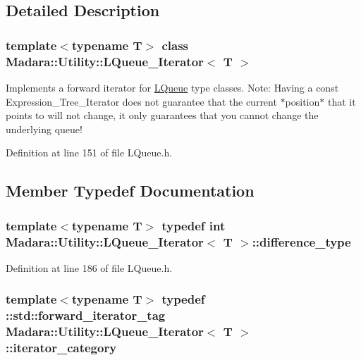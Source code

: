 \subsection{Detailed Description}
\subsubsection*{template$<$typename T$>$ class Madara::Utility::LQueue\_\-Iterator$<$ T $>$}

Implements a forward iterator for \hyperlink{classMadara_1_1Utility_1_1LQueue}{LQueue} type classes. Note: Having a const Expression\_\-Tree\_\-Iterator does not guarantee that the current $\ast$position$\ast$ that it points to will not change, it only guarantees that you cannot change the underlying queue! 

Definition at line 151 of file LQueue.h.



\subsection{Member Typedef Documentation}
\hypertarget{classMadara_1_1Utility_1_1LQueue__Iterator_a2cd150570b835cbf73880e080e4d69c3}{
\subsubsection[{difference\_\-type}]{\setlength{\rightskip}{0pt plus 5cm}template$<$typename T$>$ typedef int {\bf Madara::Utility::LQueue\_\-Iterator}$<$ T $>$::{\bf difference\_\-type}}}
\label{df/dbb/classMadara_1_1Utility_1_1LQueue__Iterator_a2cd150570b835cbf73880e080e4d69c3}


Definition at line 186 of file LQueue.h.

\hypertarget{classMadara_1_1Utility_1_1LQueue__Iterator_a4168516b4826eee61600d72fbc493a9e}{
\subsubsection[{iterator\_\-category}]{\setlength{\rightskip}{0pt plus 5cm}template$<$typename T$>$ typedef ::std::forward\_\-iterator\_\-tag {\bf Madara::Utility::LQueue\_\-Iterator}$<$ T $>$::{\bf iterator\_\-category}}}
\label{df/dbb/classMadara_1_1Utility_1_1LQueue__Iterator_a4168516b4826eee61600d72fbc493a9e}


